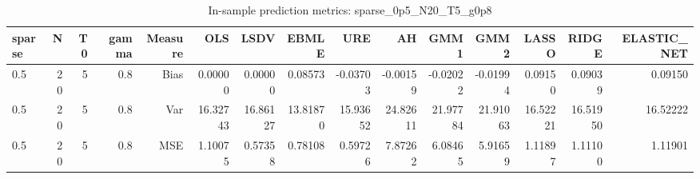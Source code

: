 \begin{table}[!htbp]\centering
\caption{In-sample prediction metrics: sparse_0p5_N20_T5_g0p8}
\label{tab:table2_sparse_0p5_N20_T5_g0p8}
\begin{tabular}{lrrrrrrrrrrrrrr}
\hline
sparse & N & T0 & gamma & Measure & OLS & LSDV & EBMLE & URE & AH & GMM1 & GMM2 & LASSO & RIDGE & ELASTIC_NET \\
\hline
0.5 & 20 & 5 & 0.8 & Bias & 0.00000 & 0.00000 & 0.08573 & -0.03703 & -0.00159 & -0.02022 & -0.01994 & 0.09150 & 0.09039 & 0.09150 \\
0.5 & 20 & 5 & 0.8 & Var & 16.32743 & 16.86127 & 13.81870 & 15.93652 & 24.82611 & 21.97784 & 21.91063 & 16.52221 & 16.51950 & 16.52222 \\
0.5 & 20 & 5 & 0.8 & MSE & 1.10075 & 0.57358 & 0.78108 & 0.59726 & 7.87262 & 6.08465 & 5.91659 & 1.11897 & 1.11100 & 1.11901 \\
\hline
\end{tabular}
\end{table}

